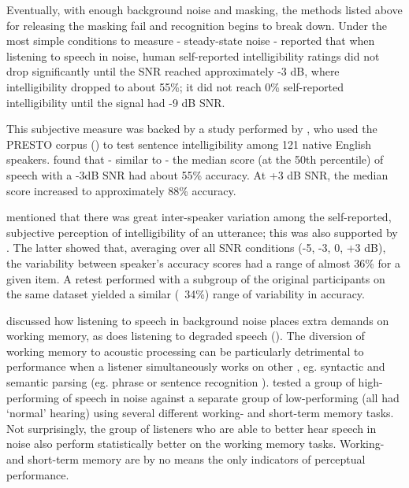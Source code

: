 Eventually, with enough background noise and masking, the methods listed above for releasing the masking fail and recognition begins to break down.  Under the most simple conditions to measure - steady-state noise - \cite{ding:13} reported that when listening to speech in noise, human self-reported intelligibility ratings did not drop significantly until the SNR reached approximately -3 dB, where intelligibility dropped to about 55\%;  it did not reach 0\% self-reported intelligibility until the signal had -9 dB SNR.

This subjective measure was backed by a study performed by \cite{gilbert:13}, who used the PRESTO corpus (\cite{garofolo:93}) to test sentence intelligibility among 121 native English speakers.  \cite{gilbert:13} found that - similar to \cite{ding:13} - the median score (at the 50th percentile) of speech with a -3dB SNR had about 55\% accuracy.  At +3 dB SNR, the median score increased to approximately 88\% accuracy.

\cite{ding:13} mentioned that there was great inter-speaker variation among the self-reported, subjective perception of intelligibility of an utterance; this was also supported by \DIFdelbegin {}\DIFdelend \DIFaddbegin {}\DIFaddend . The latter showed that, averaging over all SNR conditions (-5, -3, 0, +3 dB), the variability between speaker's accuracy scores had a range of almost 36\% for a given item.  A retest performed with a subgroup of the original participants on the same dataset yielded a similar (~34\%) range of variability in accuracy.  

\cite{francis:10} discussed how listening to speech in background noise places extra demands on working memory, as does listening to degraded speech (\cite{francis:09}).  The diversion of working memory to acoustic processing can be particularly detrimental to performance when a listener simultaneously works on other \DIFdelbegin {}\DIFdelend \DIFaddbegin {}\DIFaddend , eg. syntactic and semantic parsing (eg. phrase or sentence recognition \cite{caplan:99}). \cite{tamati:13} tested a group of high-performing \DIFdelbegin {}\DIFdelend \DIFaddbegin {}\DIFaddend of speech in noise against a separate group of low-performing \DIFdelbegin {}\DIFdelend \DIFaddbegin {}\DIFaddend (all had `normal' hearing) using several different working- and short-term memory tasks.  Not surprisingly, the group of listeners who are able to better hear speech in noise also perform statistically better on the working memory tasks.  Working- and short-term memory are by no means the only indicators of perceptual performance.


